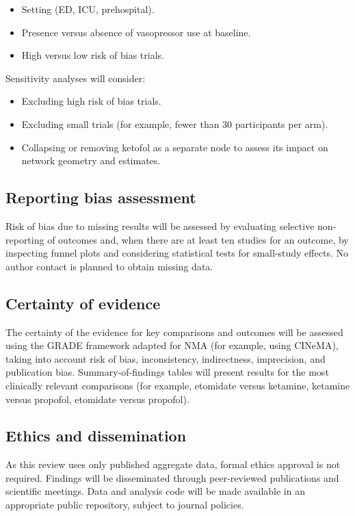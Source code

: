 \documentclass[11pt]{article}
\begin{document}
\begin{itemize}
  \item Setting (ED, ICU, prehospital).
  \item Presence versus absence of vasopressor use at baseline.
  \item High versus low risk of bias trials.
\end{itemize}

Sensitivity analyses will consider:

\begin{itemize}
  \item Excluding high risk of bias trials.
  \item Excluding small trials (for example, fewer than 30 participants per arm).
  \item Collapsing or removing ketofol as a separate node to assess its impact on network geometry and estimates.
\end{itemize}

\subsection{Reporting bias assessment}

Risk of bias due to missing results will be assessed by evaluating selective non-reporting of outcomes and, when there are at least ten studies for an outcome, by inspecting funnel plots and considering statistical tests for small-study effects. No author contact is planned to obtain missing data.

\subsection{Certainty of evidence}

The certainty of the evidence for key comparisons and outcomes will be assessed using the GRADE framework adapted for NMA (for example, using CINeMA), taking into account risk of bias, inconsistency, indirectness, imprecision, and publication bias. Summary-of-findings tables will present results for the most clinically relevant comparisons (for example, etomidate versus ketamine, ketamine versus propofol, etomidate versus propofol).

\subsection{Ethics and dissemination}

As this review uses only published aggregate data, formal ethics approval is not required. Findings will be disseminated through peer-reviewed publications and scientific meetings. Data and analysis code will be made available in an appropriate public repository, subject to journal policies.
\end{document}
